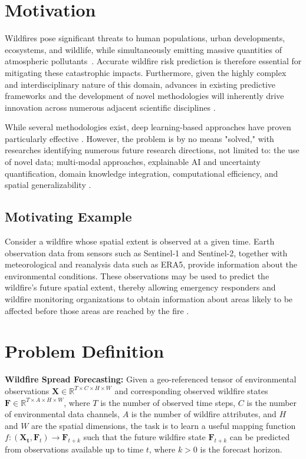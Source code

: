 \documentclass[sigconf]{acmart}
\begin{document}
\section{Motivation}
Wildfires pose significant threats to human populations, urban developments, ecosystems, and wildlife, while simultaneously emitting massive quantities of atmospheric pollutants~\cite{XU2025632}. Accurate wildfire risk prediction is therefore essential for mitigating these catastrophic impacts. Furthermore, given the highly complex and interdisciplinary nature of this domain, advances in existing predictive frameworks and the development of novel methodologies will inherently drive innovation across numerous adjacent scientific disciplines \cite{FAIRMAN2025104175}. 

While several methodologies exist, deep learning-based approaches have proven particularly effective \cite{XU2025632}. However, the problem is by no means "solved," with researches identifying numerous future research directions, not limited to: the use of novel data; multi-modal approaches, explainable AI and uncertainty quantification, domain knowledge integration, computational efficiency, and spatial generalizability \cite{XU2025632}.     

\subsection{Motivating Example}
Consider a wildfire whose spatial extent is observed at a given time. Earth observation data from sensors such as Sentinel-1 and Sentinel-2, together with meteorological and reanalysis data such as ERA5, provide information about the environmental conditions. These observations may be used to predict the wildfire's future spatial extent, thereby allowing emergency responders and wildfire monitoring organizations to obtain information about areas likely to be affected before those areas are reached by the fire \cite{XU2025632}.

\section{Problem Definition}
\textbf{Wildfire Spread Forecasting:} Given a geo-referenced tensor of environmental observations $\mathbf{X} \in \mathbb{R}^{T \times C \times H \times W}$ and corresponding observed wildfire states $\mathbf{F} \in \mathbb{R}^{T \times A \times H \times W}$, where $T$ is the number of observed time steps, $C$ is the number of environmental data channels, $A$ is the number of wildfire attributes, and $H$ and $W$ are the spatial dimensions, the task is to learn a useful mapping function $\displaystyle{f:(\mathbf{X_{t}},\mathbf{F}_{t}) \rightarrow \mathbf{F}_{t+k}}$ such that the future wildfire state $\mathbf{F}_{t+k}$ can be predicted from observations available up to time $t$, where $k>0$ is the forecast horizon.
\end{document}
